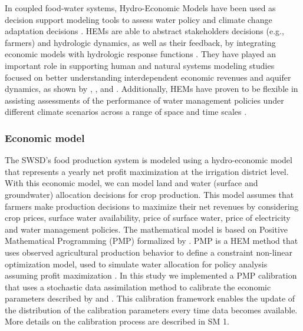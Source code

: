 \documentclass[a4paper,fleqn]{cas-sc}
\begin{document}
In coupled food-water systems, Hydro-Economic Models have been used as decision support modeling tools to assess water policy and climate change adaptation decisions \citep{ward_hydroeconomic_2021,harou_hydro-economic_2009}. HEMs are able to abstract stakeholders decisions (e.g., farmers) and hydrologic dynamics, as well as their feedback, by integrating economic models with hydrologic response functions \citep{harou_hydro-economic_2009}. They have played an important role in supporting human and natural systems modeling studies focused on better understanding interdependent economic revenues and aquifer dynamics, as shown by \citet{macewan_hydroeconomic_2017}, \citet{afshar_multi-objective_2020}, \citet{graveline_combining_2020} and \citet{rodriguez-flores_global_2022}. Additionally, HEMs have proven to be flexible in assisting assessments of the performance of water management policies under different climate scenarios across a range of space and time scales \citep{partida_hydro-economic_2023}.

\subsubsection{Economic model}\label{sct:hem}

The SWSD's food production system is modeled using a hydro-economic model \citep{harou_hydro-economic_2009} that represents a yearly net profit maximization at the irrigation district level. With this economic model, we can model land and water (surface and groundwater) allocation decisions for crop production. This model assumes that farmers make production decisions to maximize their net revenues by considering crop prices, surface water availability, price of surface water, price of electricity and water management policies. The mathematical model is based on Positive Mathematical Programming (PMP) formalized by \citet{howitt_calibration_1995}. PMP is a HEM method that uses observed agricultural production behavior to define a constraint non-linear optimization model, used to simulate water allocation for policy analysis assuming profit maximization \citep{graveline_combining_2020,macewan_hydroeconomic_2017,howitt_calibrating_2012,rodriguez-flores_insights_2019}. In this study we implemented a PMP calibration that uses a stochastic data assimilation method to calibrate the economic parameters described by \citet{maneta_stochastic_2014} and \citet{maneta_satellite-driven_2020}. This calibration framework enables the update of the distribution of the calibration parameters every time data becomes available. More details on the calibration process are described in SM 1. 
\end{document}
